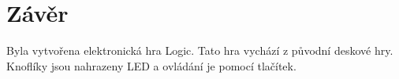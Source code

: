\chapter*{Závěr}
{}

Byla vytvořena elektronická hra Logic. Tato hra vychází z původní deskové hry. Knoflíky jsou nahrazeny
LED a ovládání je pomocí tlačítek.
